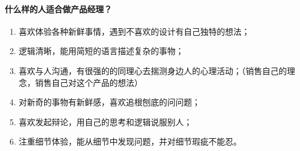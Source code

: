 \documentclass[letterpaper,11pt,english]{sphinxmanual}
\begin{document}
\paragraph{什么样的人适合做产品经理？}
\label{\detokenize{chapter_experience/career_path:id4}}\begin{enumerate}
%
\item {} 
喜欢体验各种新鲜事情，遇到不喜欢的设计有自己独特的想法；

\item {} 
逻辑清晰，能用简短的语言描述复杂的事物；

\item {} 
喜欢与人沟通，有很强的的同理心去揣测身边人的心理活动；（销售自己的理念，销售自己对这个产品的想法）

\item {} 
对新奇的事物有新鲜感，喜欢追根刨底的问问题；

\item {} 
喜欢发起辩论，用自己的思考和逻辑说服别人；

\item {} 
注重细节体验，能从细节中发现问题，并对细节瑕疵不能忍。

\end{enumerate}
\end{document}
